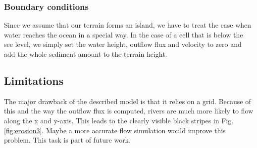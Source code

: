 \documentclass[journal, letterpaper]{IEEEtran}
\begin{document}
\subsubsection{Boundary conditions}
Since we assume that our terrain forms an island, we have to treat the case when water reaches the ocean in a special way.
In the case of a cell that is below the see level, we simply set the water height, outflow flux and velocity to zero and add the whole sediment amount to the terrain height.

\subsection{Limitations}
The major drawback of the described model is that it relies on a grid. Because of this and the way the outflow flux is computed, rivers are much more likely to flow along the x and y-axis. 
This leads to the clearly visible black stripes in Fig. \ref{fig:erosion3}. Maybe a more accurate flow simulation would improve this problem. This task is part of future work.
\end{document}
